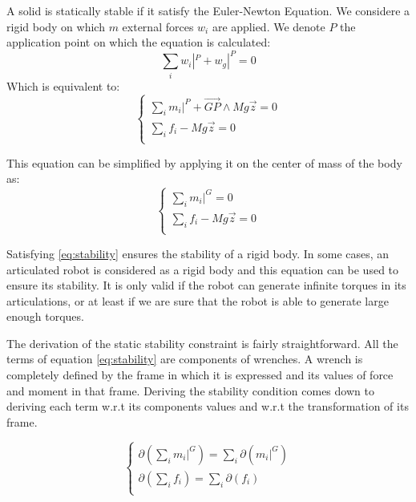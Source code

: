 A solid is statically stable if it satisfy the Euler-Newton Equation. We considere a rigid body on which $m$ external forces $w_i$ are applied. We denote $P$ the application point on which the equation is calculated:
\begin{equation}
  \sum\limits_i w_i|^P + w_g|^P = 0
\end{equation}
Which is equivalent to:
\begin{equation}
\left\{
\begin{array}{r}
  \sum\limits_i m_i|^P + \overrightarrow{GP}\wedge Mg\vec{z} = 0 \\
  \sum\limits_i f_i - Mg\vec{z} = 0 \\
\end{array}
\right.
\end{equation}

This equation can be simplified by applying it on the center of mass of the body as:
\begin{equation}
\left\{
\begin{array}{r}
  \sum\limits_i m_i|^G = 0 \\
  \sum\limits_i f_i - Mg\vec{z} = 0 \\
\end{array}
\right.
\label{eq:stability}
\end{equation}

Satisfying \ref{eq:stability} ensures the stability of a rigid body.
In some cases, an articulated robot is considered as a rigid body and this equation can be used to ensure its stability.
It is only valid if the robot can generate infinite torques in its articulations, or at least if we are sure that the robot is able to generate large enough torques.

The derivation of the static stability constraint is fairly straightforward.
All the terms of equation \ref{eq:stability} are components of wrenches.
A wrench is completely defined by the frame in which it is expressed and its values of force and moment in that frame.
Deriving the stability condition comes down to deriving each term w.r.t its components values and w.r.t the transformation of its frame.

\begin{equation}
\left\{
\begin{array}{r}
  \partial\left(\sum\limits_i m_i|^G\right) = \sum\limits_i \partial(m_i|^G) \\
  \partial\left(\sum\limits_i f_i\right) = \sum\limits_i \partial(f_i) \\
\end{array}
\right.
\label{eq:derivation_stability}
\end{equation}

